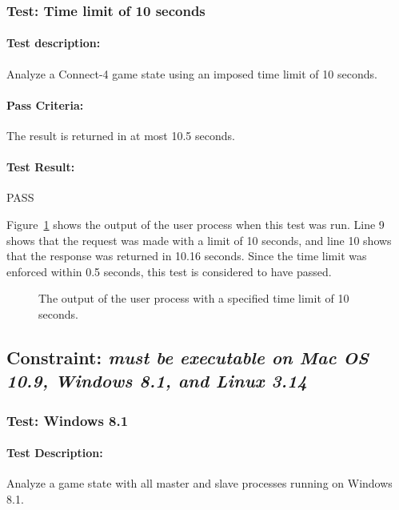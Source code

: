 \documentclass[pdftex,12pt,a4paper]{article}
\begin{document}
\subsubsection{\textbf{Test:} Time limit of 10 seconds}

\paragraph{Test description:} Analyze a Connect-4 game state using an imposed time limit of 10 seconds. 

\paragraph{Pass Criteria:} The result is returned in at most 10.5 seconds.

\paragraph{Test Result:} PASS

Figure~\ref{fig:user-10} shows the output of the user process when this test was run. Line 9 shows that the request was made with a limit of 10 seconds, and line 10 shows that the response was returned in 10.16 seconds. Since the time limit was enforced within 0.5 seconds, this test is considered to have passed.

\begin{figure}[h]

\caption{The output of the user process with a specified time limit of 10 seconds.}
\label{fig:user-10}
\end{figure}



\subsection{\textbf{Constraint:} \emph{must be executable on Mac OS 10.9, Windows 8.1, and Linux 3.14}}

\subsubsection{\textbf{Test:} Windows 8.1}

\paragraph{Test Description:} Analyze a game state with all master and slave processes running on Windows 8.1.
\end{document}
